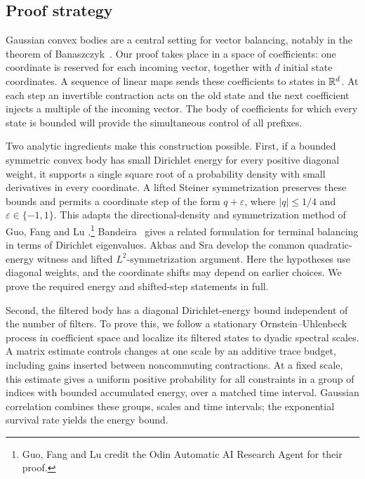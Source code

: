 \subsection{Proof strategy}

Gaussian convex bodies are a central setting for vector balancing, notably
in the theorem of Banaszczyk~\cite{Banaszczyk1998}. Our proof takes place
in a space of coefficients: one coordinate is
reserved for each incoming vector, together with $d$ initial state
coordinates. A sequence of linear maps sends these coefficients to
states in $\mathbb R^d$. At each step an invertible contraction acts on the old
state and the next coefficient injects a multiple of the incoming vector.
The body of coefficients for which every state is bounded will provide
the simultaneous control of all prefixes.

Two analytic ingredients make this construction possible. First, if a
bounded symmetric convex body has small Dirichlet energy for every
positive diagonal weight, it supports a single square root of a probability density
with small derivatives in every coordinate. A lifted Steiner
symmetrization preserves these bounds and permits a coordinate step
of the form $q+\varepsilon$, where $|q|\le1/4$ and
$\varepsilon\in\{-1,1\}$. This adapts the directional-density and
symmetrization method of Guo, Fang and Lu
\cite[Sections~3--4]{GuoFangLu2026}.\footnote{Guo, Fang and Lu
credit the Odin Automatic AI Research Agent for their proof.}
Bandeira~\cite{Bandeira2026} gives a related formulation for terminal
balancing in terms of Dirichlet eigenvalues. Akbas and Sra
\cite[Lemmas~2.2--2.3]{AkbasSra2026} develop the common quadratic-energy
witness and lifted $L^2$-symmetrization argument. Here the hypotheses use
diagonal weights, and the coordinate shifts may depend on earlier choices.
We prove the required energy and shifted-step statements in full.

Second, the filtered body has a diagonal Dirichlet-energy bound
independent of the number of filters. To prove this, we follow a stationary Ornstein--Uhlenbeck process
in coefficient space and localize its filtered states to dyadic spectral
scales. A matrix estimate controls changes at one scale by an additive
trace budget, including gains inserted between noncommuting contractions.
At a fixed scale, this estimate gives a uniform positive probability
for all constraints in a group of indices with bounded accumulated energy,
over a matched time interval. Gaussian correlation combines these groups,
scales and time intervals; the exponential survival rate yields the energy
bound.


